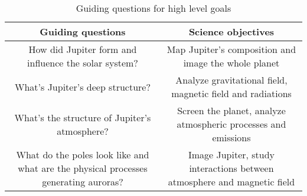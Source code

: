 \renewcommand{\arraystretch}{1.5}
\begin{table}[H]
    \centering
    \begin{tabular}{|c|c|}
        \hline
        \textbf{Guiding questions} & \textbf{Science objectives} \\ 
        \hline
        How did Jupiter form and influence the solar system? & Map Jupiter's composition and image the whole planet \\ 
        \hline
        What's Jupiter's deep structure? & Analyze gravitational field, magnetic field and radiations  \\ 
        \hline
        What's the structure of Jupiter's atmosphere? & Screen the planet, analyze atmospheric processes and emissions  \\ 
        \hline
        What do the poles look like and what are the physical processes generating auroras? & Image Jupiter, study interactions between atmosphere and magnetic field \\ 
        \hline
     
    \end{tabular}
    \centering
    \caption{Guiding questions for high level goals}
    \label{tab:Guiding questions for high level goals}
\end{table}

\renewcommand{\arraystretch}{1}

